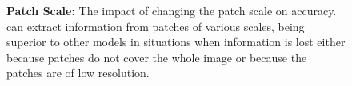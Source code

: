 \begin{figure}[t]
\begin{center}
\begin{small}
\begin{sc}
\begin{center}
\end{center}
\end{sc}
\end{small}
\end{center}
\afterplot
\caption{\textbf{Patch Scale:} The impact of changing the patch scale on accuracy. \ours{} can extract information from patches of various scales, being superior to other models in situations when information is lost either because patches do not cover the whole image or because the patches are of low resolution.}
\label{fig:zoom-sample}
\end{figure}